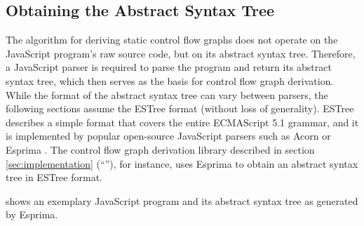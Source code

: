 \subsection{Obtaining the Abstract Syntax Tree}

The algorithm for deriving static control flow graphs does not operate on the JavaScript program's raw source code, but on its abstract syntax tree. Therefore, a JavaScript parser is required to parse the program and return its abstract syntax tree, which then serves as the basis for control flow graph derivation. While the format of the abstract syntax tree can vary between parsers, the following sections assume the ESTree \cite{estree-spec} format (without loss of generality). ESTree describes a simple format that covers the entire ECMAScript 5.1 grammar, and it is implemented by popular open-source JavaScript parsers such as Acorn \cite{acorn} or Esprima \cite{esprima}. The control flow graph derivation library described in section \ref{sec:implementation} (``''), for instance, uses Esprima to obtain an abstract syntax tree in ESTree format.

 shows an exemplary JavaScript program and its abstract syntax tree as generated by Esprima.
